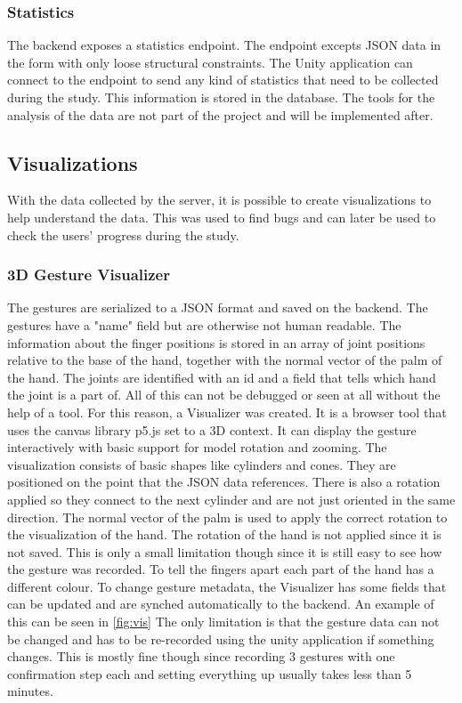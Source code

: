 \subsubsection{Statistics}
The backend exposes a statistics endpoint. The endpoint excepts JSON data in the form with only loose structural constraints. The Unity application can connect to the endpoint to send any kind of statistics that need to be collected during the study. This information is stored in the database. The tools for the analysis of the data are not part of the project and will be implemented after.  


\subsection{Visualizations}
With the data collected by the server, it is possible to create visualizations to help understand the data. This was used to find bugs and can later be used to check the users' progress during the study.

\subsubsection{3D Gesture Visualizer}
The gestures are serialized to a JSON format and saved on the backend. The gestures have a "name" field but are otherwise not human readable. The information about the finger positions is stored in an array of joint positions relative to the base of the hand, together with the normal vector of the palm of the hand. The joints are identified with an id and a field that tells which hand the joint is a part of. All of this can not be debugged or seen at all without the help of a tool. For this reason, a Visualizer was created. It is a browser tool that uses the canvas library p5.js set to a 3D context. It can display the gesture interactively with basic support for model rotation and zooming. The visualization consists of basic shapes like cylinders and cones. They are positioned on the point that the JSON data references. There is also a rotation applied so they connect to the next cylinder and are not just oriented in the same direction. The normal vector of the palm is used to apply the correct rotation to the visualization of the hand. The rotation of the hand is not applied since it is not saved. This is only a small limitation though since it is still easy to see how the gesture was recorded. To tell the fingers apart each part of the hand has a different colour. To change gesture metadata, the Visualizer has some fields that can be updated and are synched automatically to the backend. An example of this can be seen in \ref{fig:vis} The only limitation is that the gesture data can not be changed and has to be re-recorded using the unity application if something changes. This is mostly fine though since recording 3 gestures with one confirmation step each and setting everything up usually takes less than 5 minutes.

